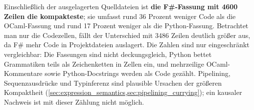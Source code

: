 \begin{finding}
Einschließlich der ausgelagerten Quelldateien ist \textbf{die F\#-Fassung mit 4600 Zeilen die kompakteste}; sie umfasst rund 36 Prozent weniger Code als die OCaml-Fassung und rund 17 Prozent weniger als die Python-Fassung.
Betrachtet man nur die Codezellen, fällt der Unterschied mit 3486 Zeilen deutlich größer aus, da F\# mehr Code in Projektdateien auslagert.
Die Zahlen sind nur eingeschränkt vergleichbar: Die Fassungen sind nicht deckungsgleich, Python bettet Grammatiken teils als Zeichenketten in Zellen ein, und mehrzeilige OCaml-Kommentare sowie Python-Docstrings werden als Code gezählt.
Pipelining, Sequenzausdrücke und Typinferenz sind plausible Ursachen der größeren Kompaktheit (\cref{sec:expression_semantics,sec:pipelining_currying}); ein kausaler Nachweis ist mit dieser Zählung nicht möglich.
\end{finding}